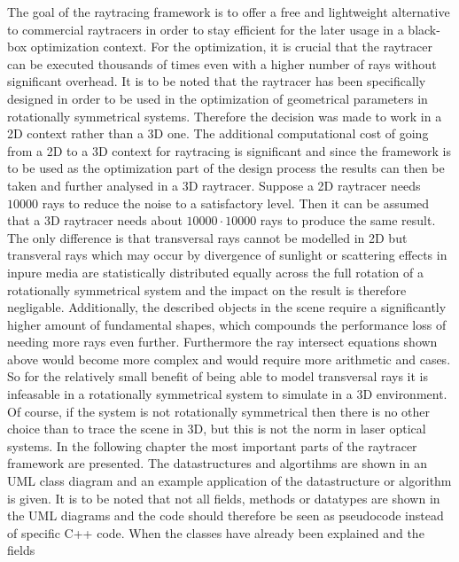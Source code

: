 \documentclass[a4paper,10pt]{article}
\begin{document}
    The goal of the raytracing framework is to offer a free and lightweight
    alternative to commercial raytracers in order to stay efficient
    for the later usage in a black-box optimization context.
    For the optimization, it is crucial that the raytracer can be executed thousands of times
    even with a higher number of rays without significant overhead.
    It is to be noted that the raytracer has been specifically designed in
    order to be used in the optimization of geometrical parameters in
    rotationally symmetrical systems.
    Therefore the decision was made to work in a 2D context rather than a 3D
    one.
    The additional computational cost of going from a 2D to a 3D context for
    raytracing is significant and since the framework is to be used as
    the optimization part of the design process the results can then be
    taken and further analysed in a 3D raytracer.
    Suppose a 2D raytracer needs $10000$ rays to reduce the noise to a
    satisfactory level.
    Then it can be assumed that a 3D raytracer needs about $10000 \cdot
    10000$ rays to produce the same result.
    The only difference is that transversal rays cannot be modelled in
    2D but transveral rays which may occur by divergence of sunlight or
    scattering effects in inpure media are statistically distributed
    equally across the full rotation of a rotationally symmetrical system and the impact
    on the result is therefore negligable.
    Additionally, the described objects in the scene require a significantly
    higher amount of fundamental shapes, which compounds the performance
    loss of needing more rays even further.
    Furthermore the ray intersect equations shown above would become more
    complex and would require more arithmetic and cases.
    So for the relatively small benefit of being able to model transversal
    rays it is infeasable in a rotationally symmetrical system to simulate in a 3D environment.
    Of course, if the system is not rotationally symmetrical then there
    is no other choice than to trace the scene in 3D, but this is
    not the norm in laser optical systems.
    In the following chapter the most important parts of the raytracer
    framework are presented.
    The datastructures and algortihms are shown in an UML class diagram
    and an example application of the datastructure or algorithm is given. 
    It is to be noted that not all fields, methods or datatypes
    are shown in the UML diagrams and the code should therefore
    be seen as pseudocode instead of specific C++ code.
    When the classes have already been explained and the fields
\end{document}
